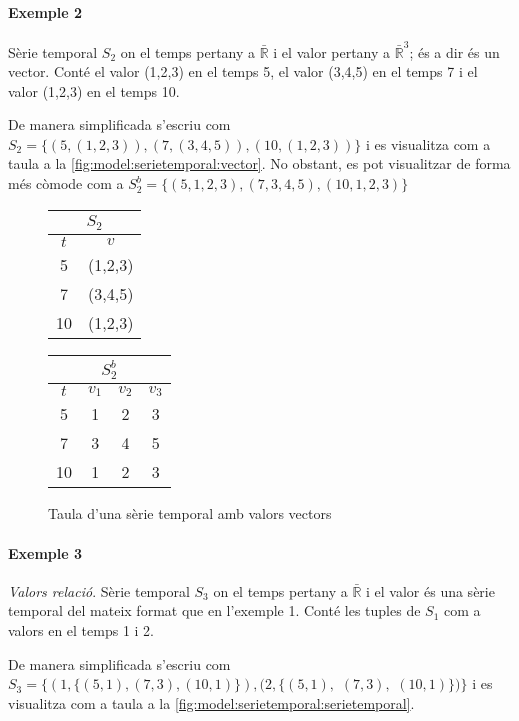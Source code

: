 \paragraph{Exemple 2}
Sèrie temporal $S_2$ on el temps pertany a $\bar{\mathbb{R}}$ i el valor pertany a  $\bar{\mathbb{R}}^3$; és a dir és un vector. Conté el valor (1,2,3) en el temps 5, el valor (3,4,5) en el temps 7 i el valor (1,2,3) en el temps 10.

De manera simplificada s'escriu com 
$S_2 = \{ (5,(1,2,3)), (7,(3,4,5)), (10,(1,2,3)) \}$ i es visualitza com a taula a la \autoref{fig:model:serietemporal:vector}. No obstant, es pot visualitzar de forma més còmode com a $S_2^b = \{ (5,1,2,3), (7,3,4,5), (10,1,2,3) \}$

\begin{figure}[tp]
  \centering
  \begin{tabular}{|c|c|}
    \multicolumn{2}{c}{$S_2$} \\ \hline
    $t$  & $v$ \\ \hline
    5  & (1,2,3) \\
    7  & (3,4,5) \\
    10 & (1,2,3) \\ \hline
  \end{tabular} \qquad
  \begin{tabular}[tp]{|c|c|c|c|}
   \multicolumn{4}{c}{$S_2^b$} \\ \hline
    $t$  & $v_1$ & $v_2$ & $v_3$ \\ \hline
    5  & 1 & 2 & 3 \\
    7  & 3 & 4 & 5 \\
    10 & 1 & 2 & 3 \\ \hline
  \end{tabular}

  \caption{Taula d'una sèrie temporal amb valors vectors}
  \label{fig:model:serietemporal:vector}
\end{figure}


\paragraph{Exemple 3} \emph{Valors relació}. \label{par:model:exemple-relvalues}
Sèrie temporal $S_3$ on el temps pertany a $\bar{\mathbb{R}}$ i el valor és una sèrie temporal del mateix format que en l'exemple 1. Conté les tuples de $S_1$ com a valors en el temps 1 i 2. 

De manera simplificada s'escriu com
$S_3 =  \{ (1,\{ (5,1), (7,3), (10,1) \}), 
(2,\{ (5,1),$ $(7,3),$ $(10,1) \}) \}$
i es visualitza com a taula a la \autoref{fig:model:serietemporal:serietemporal}.


